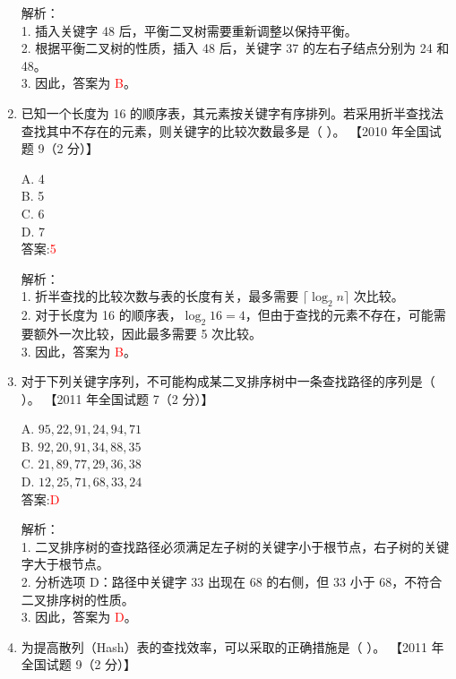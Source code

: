 \documentclass[lang=cn,newtx,10pt,scheme=chinese]{../../../elegantbook}
\begin{document}
\begin{enumerate}
    解析：\\
    1. 插入关键字 48 后，平衡二叉树需要重新调整以保持平衡。\\
    2. 根据平衡二叉树的性质，插入 48 后，关键字 37 的左右子结点分别为 24 和 48。\\
    3. 因此，答案为 \textcolor{red}{B}。\\

   

\item 已知一个长度为 16 的顺序表，其元素按关键字有序排列。若采用折半查找法查找其中不存在的元素，则关键字的比较次数最多是（ ）。  
    【2010 年全国试题 9（2 分）】  

    A. 4 \\  
    B. 5 \\  
    C. 6 \\  
    D. 7 \\  

    答案:\textcolor{red}{5}

    解析：\\
    1. 折半查找的比较次数与表的长度有关，最多需要 $\lceil \log_2 n \rceil$ 次比较。\\
    2. 对于长度为 16 的顺序表，$\log_2 16 = 4$，但由于查找的元素不存在，可能需要额外一次比较，因此最多需要 5 次比较。\\
    3. 因此，答案为 \textcolor{red}{B}。\\

\item 对于下列关键字序列，不可能构成某二叉排序树中一条查找路径的序列是（ ）。  
    【2011 年全国试题 7（2 分）】  

    A. $95, 22, 91, 24, 94, 71$ \\  
    B. $92, 20, 91, 34, 88, 35$ \\  
    C. $21, 89, 77, 29, 36, 38$ \\  
    D. $12, 25, 71, 68, 33, 24$ \\  

    答案:\textcolor{red}{D}

    解析：\\
    1. 二叉排序树的查找路径必须满足左子树的关键字小于根节点，右子树的关键字大于根节点。\\
    2. 分析选项 D：路径中关键字 33 出现在 68 的右侧，但 33 小于 68，不符合二叉排序树的性质。\\
    3. 因此，答案为 \textcolor{red}{D}。\\

\item 为提高散列（Hash）表的查找效率，可以采取的正确措施是（ ）。  
    【2011 年全国试题 9（2 分）】  


\end{enumerate}
\end{document}
